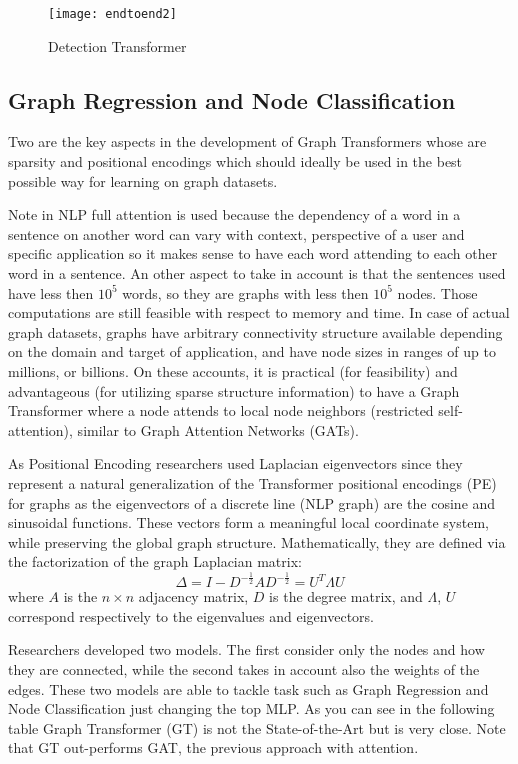 \documentclass[11pt]{article}
\begin{document}
\begin{figure}[h]
\centerline{\texttt{[image: endtoend2]}}
\caption{Detection Transformer} 
\label{fig}
\end{figure}
\newpage

\subsection{Graph Regression and Node Classification}
Two are the key aspects in the development of Graph Transformers\cite{graphs} whose are sparsity and positional encodings which should ideally be used in the best possible way for learning on graph datasets.

Note in NLP full attention is used because the dependency of a word in a sentence on another word can vary with context, perspective of a user and specific application so it makes sense to have each word attending to each other word in a sentence. An other aspect to take in account is that the sentences used have less then $10^5$ words, so they are graphs with less then $10^5$ nodes. Those computations are still feasible with respect to memory and time. In case of actual graph datasets, graphs have arbitrary connectivity structure available depending on the domain and target of application, and have node sizes in ranges of up to millions, or billions. On these accounts, it is practical (for feasibility) and advantageous (for utilizing sparse structure information) to have a Graph Transformer where a node attends to local node neighbors (restricted self-attention), similar to Graph Attention Networks (GATs). 

As Positional Encoding researchers used Laplacian eigenvectors since they represent a natural generalization of the Transformer positional encodings (PE) for graphs as the eigenvectors of a discrete line (NLP graph) are the cosine and sinusoidal functions.\cite{PE} These vectors form a meaningful local coordinate system, while preserving the global graph structure. Mathematically, they are defined via the factorization of the graph Laplacian matrix:
\begin{displaymath}
\Delta = I - D^{-\frac{1}{2}} A D^{-\frac{1}{2}} = U^T \Lambda U
\end{displaymath}
where $A$ is the $n \times n$ adjacency matrix, $D$ is the degree matrix, and $\Lambda$, $U$ correspond respectively to the eigenvalues and eigenvectors. 

Researchers developed two models. The first consider only the nodes and how they are connected, while the second takes in account also the weights of the edges. These two models are able to tackle task such as Graph Regression and Node Classification just changing the top MLP. As you can see in the following table Graph Transformer (GT) is not the State-of-the-Art but is very close. Note that GT out-performs GAT, the previous approach with attention.
\end{document}
